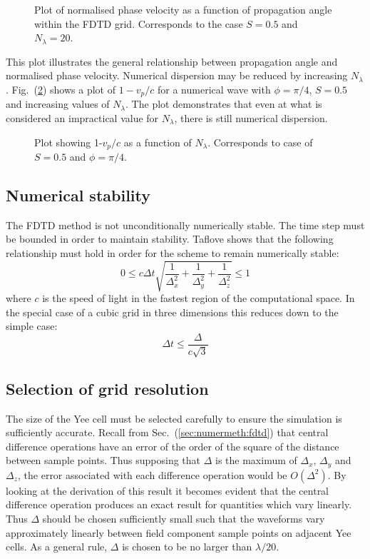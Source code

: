 \documentclass[a4paper, 12pt]{article}
\newcommand{\rfig}[1]{Fig.\ (\ref{#1})}
\newcommand{\sect}[1]{Sec.\ (\ref{#1})}
\begin{document}
	\begin{figure}[!h]
		\centering
		\caption{Plot of normalised phase velocity as a function of
			propagation angle within the FDTD grid. Corresponds to the case
			$S=0.5$ and $N_\lambda=20$.}
		\label{fig:fdtd:numdispphi}
	\end{figure}
	This plot illustrates the general relationship between propagation
	angle and normalised phase velocity. Numerical dispersion may be
	reduced by increasing $N_\lambda$. \rfig{fig:fdtd:numdispN} shows a
	plot of $1-v_p/c$ for a numerical wave with $\phi=\pi/4$, $S=0.5$ and
	increasing values of $N_\lambda$. The plot demonstrates that even at
	what is considered an impractical value for $N_\lambda$, there is
	still numerical dispersion.
	\begin{figure}[!h]
		\centering
		\caption{Plot showing 1-$v_p/c$ as a function of
			$N_\lambda$. Corresponds to case of $S=0.5$ and $\phi=\pi/4$.}
		\label{fig:fdtd:numdispN}
	\end{figure}
	\subsection{Numerical stability}
	The FDTD method is not unconditionally numerically stable. The time
	step must be bounded in order to maintain stability. Taflove
	\cite{taflove00book} shows that the following relationship must hold
	in order for the scheme to remain numerically stable:
	\begin{equation}
		\label{eq:fdtd:stab}
		0\le c\Delta t\sqrt{\frac{1}{\Delta^2_x}+\frac{1}{\Delta^2_y}+\frac{1}{\Delta^2_z}}\le1
	\end{equation}
	where $c$ is the speed of light in the fastest region of the
	computational space. In the special case of a cubic grid in three
	dimensions this reduces down to the simple case:
	\begin{equation}
		\Delta t\le\frac{\Delta}{c\sqrt{3}}
		\label{eq:fdtd:stabsimp}
	\end{equation}
	\subsection{Selection of grid resolution}
	The size of the Yee cell must be selected carefully to ensure the
	simulation is sufficiently accurate. Recall from
	\sect{sec:numermeth:fdtd} that central difference operations have an
	error of the order of the square of the distance between sample
	points. Thus supposing that $\Delta$ is the maximum of $\Delta_x$,
	$\Delta_y$ and $\Delta_z$, the error associated with each difference
	operation would be $O(\Delta^2)$. By looking at the derivation of this
	result it becomes evident that the central difference operation
	produces an exact result for quantities which vary linearly. Thus
	$\Delta$ should be chosen sufficiently small such that the waveforms
	vary approximately linearly between field component sample points on
	adjacent Yee cells. As a general rule, $\Delta$ is chosen to be no larger than
	$\lambda/20$. 
	
\end{document}
